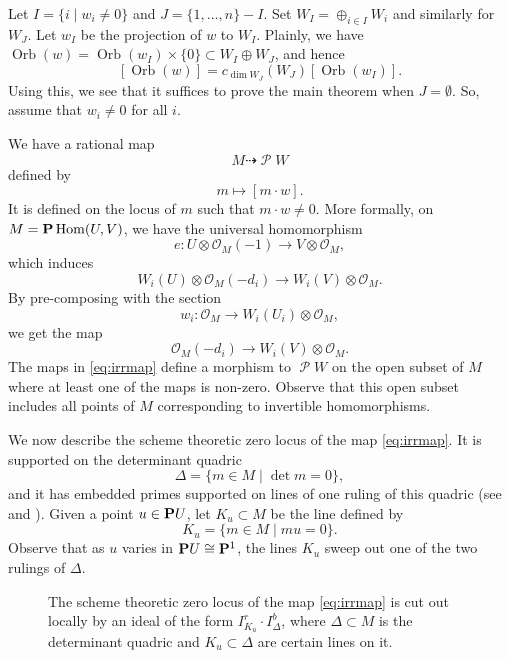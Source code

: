 \documentclass{amsart}
\DeclareMathOperator{\Orb}{Orb}
\DeclareMathOperator{\sP}{\mathscr P}
\renewcommand{\O}{\mathcal O}
\begin{document}
Let \(I = \{i \mid w_i \neq 0\}\) and \(J = \{1,\dots, n\} - I\).
Set \(W_I = \oplus_{i \in I} W_i\) and similarly for \(W_J\).
Let \(w_{I}\) be the projection of \(w\) to \(W_I\).
Plainly, we have \(\Orb(w) = \Orb(w_I) \times \{0\} \subset W_I \oplus W_J\), and hence
\[[\Orb(w)] = c_{\dim W_J}(W_J)[\Orb(w_I)].\]
Using this, we see that it suffices to prove the main theorem when \(J = \emptyset\).
So, assume that \(w_i \neq 0\) for all \(i\).


We have a rational map
\begin{equation}\label{eq:ratmap}
  M \dashrightarrow \sP W
\end{equation}
defined by
\[ m \mapsto [ m \cdot w].\]
It is defined on the locus of \(m\) such that \(m \cdot w \neq 0\).
More formally, on \(M = \P\Hom(U, V)\), we have the universal homomorphism
\[
  e \colon U \otimes \O_M(-1) \to  V \otimes \O_M,
\]
which induces
\[ W_{i}(U) \otimes \O_M(-d_{i}) \to W_{i}(V) \otimes \O_M.\]
By pre-composing with the section
\[ w_i \colon \O_M \to W_i(U_i) \otimes \O_M,\]
we get the map
\begin{equation}\label{eq:irrmap}
  \O_M(-d_{i}) \to W_{i}(V) \otimes \O_M.
\end{equation}
The maps in \eqref{eq:irrmap} define a morphism to \(\sP W\) on the open subset of \(M\) where at least one of the maps is non-zero.
Observe that this open subset includes all points of \(M\) corresponding to invertible homomorphisms.

We now describe the scheme theoretic zero locus of the map \eqref{eq:irrmap}.
It is supported on the determinant quadric
\[ \Delta = \{m \in M \mid \det m = 0\},\]
and it has embedded primes supported on lines of one ruling of this quadric (see  and ).
Given a point \(u \in \P U\), let \(K_{u} \subset M\) be the line defined by
\[ K_{u} = \{m \in M \mid m u = 0\}.\]
Observe that as \(u\) varies in \(\P U \cong \P^1\), the lines \(K_u\) sweep out one of the two rulings of \(\Delta\).
\begin{figure}
    \centering
  \caption{The scheme theoretic zero locus of the map \eqref{eq:irrmap} is cut out locally by an ideal of the form \(I_{K_u}^r \cdot I_{\Delta}^{b}\), where \(\Delta \subset M\) is the determinant quadric and \(K_u \subset \Delta\) are certain lines on it.}
  \label{fig:kd}
\end{figure}
\end{document}
